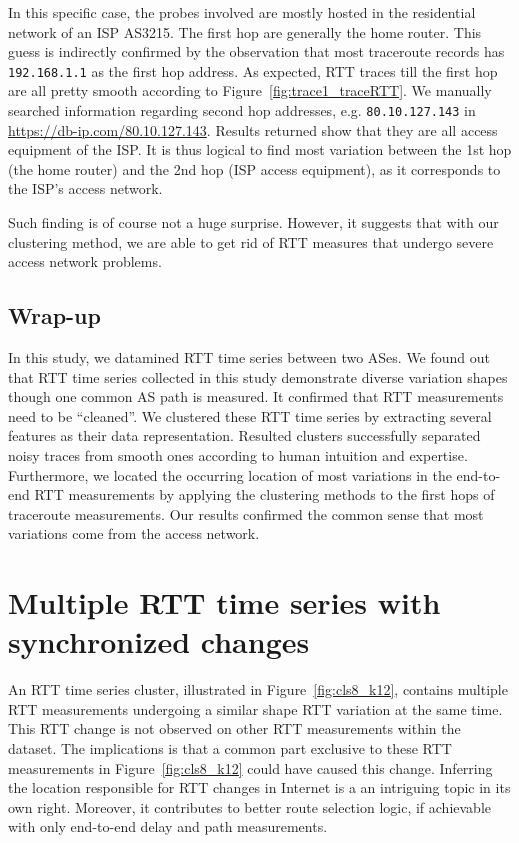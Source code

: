 In this specific case, the probes involved are mostly hosted in the residential network of an ISP AS3215.
The first hop are generally the home router. 
This guess is indirectly confirmed by the observation that most traceroute records has \texttt{192.168.1.1} as the first hop address. 
As expected, RTT traces till the first hop are all pretty smooth according to Figure~\ref{fig:trace1_traceRTT}. We manually searched information regarding second hop addresses, e.g. \texttt{80.10.127.143} in \url{https://db-ip.com/80.10.127.143}. Results returned show that they are all access equipment of the ISP.
It is thus logical to find most variation between the 1st hop (the home router) and the 2nd hop (ISP access equipment), as it corresponds to the ISP's access network.  

Such finding is of course not a huge surprise.%
However, it suggests that with our clustering method, we are able to get rid of RTT measures that undergo severe access network problems. 

\subsection*{Wrap-up}
In this study, we datamined RTT time series between two ASes. 
We found out that RTT time series collected in this study demonstrate diverse variation shapes though one common AS path is measured.
It confirmed that RTT measurements need to be ``cleaned''.
We clustered these RTT time series by extracting %
several features as their data representation. 
Resulted clusters successfully separated noisy traces from smooth ones according to human intuition and expertise.
Furthermore, we located the occurring location of most variations in the end-to-end RTT measurements by applying the clustering methods to the first hops of traceroute measurements.
Our results confirmed the common sense that most variations come from the access network.


\section{Multiple RTT time series with synchronized changes}
\label{sec:ripe_case_study}

An RTT time series cluster, illustrated in Figure~\ref{fig:cls8_k12},  contains multiple RTT measurements undergoing  a similar shape RTT variation at the same time.
This RTT change is not observed on other RTT measurements within the dataset.
The implications is that a common part exclusive to these RTT measurements in Figure~\ref{fig:cls8_k12} could have caused this change.
Inferring the location responsible for RTT changes in Internet is a an intriguing topic in its own right.
Moreover, it contributes to better route selection logic, if achievable with only end-to-end delay and path measurements.

